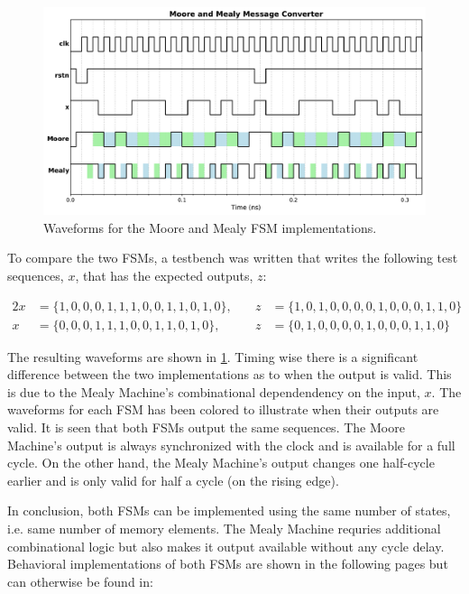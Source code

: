 \documentclass[../main.tex]{subfiles}
\begin{document}
\newpage

\begin{figure}[t]
    \centering
    \includegraphics[width=\textwidth]{assets/q2_wave.pdf}
    \caption{Waveforms for the Moore and Mealy FSM implementations.}
    \label{fig:q2_wave}
\end{figure}

To compare the two FSMs, a testbench was written that writes the following test sequences, $x$, that has the expected outputs, $z$:

\begin{alignat*}{2}
    x &= \{ 1, 0, 0, 0, 1, 1, 1, 0, 0, 1, 1, 0, 1, 0 \}, 
    &\quad z &= \{ 1, 0, 1, 0, 0, 0, 0, 1, 0, 0, 0, 1, 1, 0 \} \\[6pt]
    x &= \{ 0, 0, 0, 1, 1, 1, 0, 0, 1, 1, 0, 1, 0 \}, 
    &\quad z &= \{ 0, 1, 0, 0, 0, 0, 1, 0, 0, 0, 1, 1, 0 \}
\end{alignat*}

The resulting waveforms are shown in \cref{fig:q2_wave}. Timing wise there is a significant difference between the two implementations as to when the output is valid. This is due to the Mealy Machine's combinational dependendency on the input, $x$. The waveforms for each FSM has been colored to illustrate when their outputs are valid. It is seen that both FSMs output the same sequences. The Moore Machine's output is always synchronized with the clock and is available for a full cycle. On the other hand, the Mealy Machine's output changes one half-cycle earlier and is only valid for half a cycle (on the rising edge).

In conclusion, both FSMs can be implemented using the same number of states, i.e. same number of memory elements. The Mealy Machine requries additional combinational logic but also makes it output available without any cycle delay. Behavioral implementations of both FSMs are shown in the following pages but can otherwise be found in:
\end{document}
